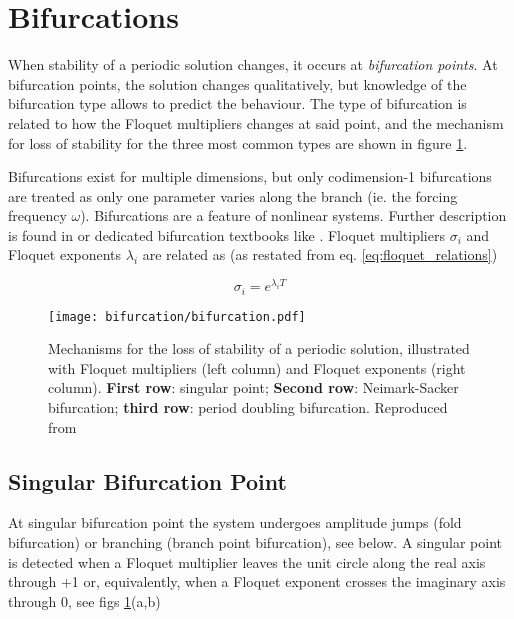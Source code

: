 
\section{Bifurcations}
\label{sec:bifurcations}

When stability of a periodic solution changes, it occurs at \textit{bifurcation
  points}. At bifurcation points, the solution changes qualitatively, but
knowledge of the bifurcation type allows to predict the behaviour. The type of
bifurcation is related to how the Floquet multipliers changes at said point, and
the mechanism for loss of stability for the three most common types are shown in
figure \ref{fig:bifurcation}.

Bifurcations exist for multiple dimensions, but only codimension-1 bifurcations
are treated as only one parameter varies along the branch (ie. the forcing
frequency $\omega$). Bifurcations are a feature of nonlinear systems. Further
description is found in \textcite{juel2003a} or dedicated bifurcation textbooks
like \textcite{kuznetsov2013a}. Floquet multipliers $\sigma_i$ and Floquet
exponents $\lambda_i$ are related as (as restated from eq.
\eqref{eq:floquet_relations})

\begin{equation}
  \sigma_i = e^{\lambda_i T}
\end{equation}

\begin{figure}
  \centering
  \texttt{[image: bifurcation/bifurcation.pdf]}
  \caption{Mechanisms for the loss of stability of a periodic solution,
    illustrated with Floquet multipliers (left column) and Floquet exponents
    (right column).
    \textbf{First row}: singular point;
    \textbf{Second row}: Neimark-Sacker bifurcation;
    \textbf{third row}: period doubling bifurcation.
    Reproduced from \parencite{detroux2016_phd}}
  \label{fig:bifurcation}
\end{figure}

\subsection{Singular Bifurcation Point}
\label{sec:singular_bif}

At singular bifurcation point the system undergoes amplitude jumps (fold
bifurcation) or branching (branch point bifurcation), see below.
A singular point is detected when a Floquet multiplier leaves the unit circle
along the real axis through +1 or, equivalently, when a Floquet exponent crosses
the imaginary axis through 0, see figs \ref{fig:bifurcation}(a,b)

